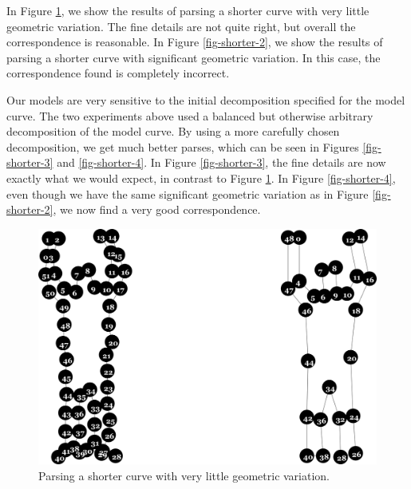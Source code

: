 In Figure \ref{fig-shorter-1}, we show the results of parsing a
shorter curve with very little geometric variation. The fine details
are not quite right, but overall the correspondence is reasonable. In
Figure \ref{fig-shorter-2}, we show the results of parsing a shorter
curve with significant geometric variation. In this case, the
correspondence found is completely incorrect.

Our models are very sensitive to the initial decomposition specified
for the model curve. The two experiments above used a balanced but
otherwise arbitrary decomposition of the model curve. By using a more
carefully chosen decomposition, we get much better parses, which can
be seen in Figures \ref{fig-shorter-3} and \ref{fig-shorter-4}. In
Figure \ref{fig-shorter-3}, the fine details are now exactly what we
would expect, in contrast to Figure \ref{fig-shorter-1}. In Figure
\ref{fig-shorter-4}, even though we have the same significant
geometric variation as in Figure \ref{fig-shorter-2}, we now find a
very good correspondence.

\begin{figure}
\includegraphics[width=\linewidth]{output/1.models/shorter_curves/parse_8.png}
\caption{Parsing a shorter curve with very little geometric variation.}
\label{fig-shorter-1}
\end{figure}

